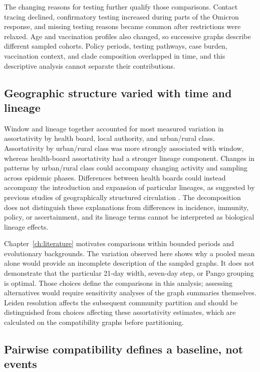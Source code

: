 The changing reasons for testing further qualify those comparisons. Contact tracing declined, confirmatory testing increased during parts of the Omicron response, and missing testing reasons became common after restrictions were relaxed. Age and vaccination profiles also changed, so successive graphs describe different sampled cohorts. Policy periods, testing pathways, case burden, vaccination context, and clade composition overlapped in time, and this descriptive analysis cannot separate their contributions.

\subsection{Geographic structure varied with time and lineage}\label{sec:ch4_discussion_geography_lineage}

Window and lineage together accounted for most measured variation in assortativity by health board, local authority, and urban/rural class. Assortativity by urban/rural class was more strongly associated with window, whereas health-board assortativity had a stronger lineage component. Changes in patterns by urban/rural class could accompany changing activity and sampling across epidemic phases. Differences between health boards could instead accompany the introduction and expansion of particular lineages, as suggested by previous studies of geographically structured circulation \citep{daSilvaFilipe2020,duPlessis2021}. The decomposition does not distinguish these explanations from differences in incidence, immunity, policy, or ascertainment, and its lineage terms cannot be interpreted as biological lineage effects.

Chapter~\ref{ch:literature} motivates comparisons within bounded periods and evolutionary backgrounds. The variation observed here shows why a pooled mean alone would provide an incomplete description of the sampled graphs. It does not demonstrate that the particular 21-day width, seven-day step, or Pango grouping is optimal. Those choices define the comparisons in this analysis; assessing alternatives would require sensitivity analyses of the graph summaries themselves. Leiden resolution affects the subsequent community partition and should be distinguished from choices affecting these assortativity estimates, which are calculated on the compatibility graphs before partitioning.

\subsection{Pairwise compatibility defines a baseline, not events}\label{sec:ch4_discussion_topology}


